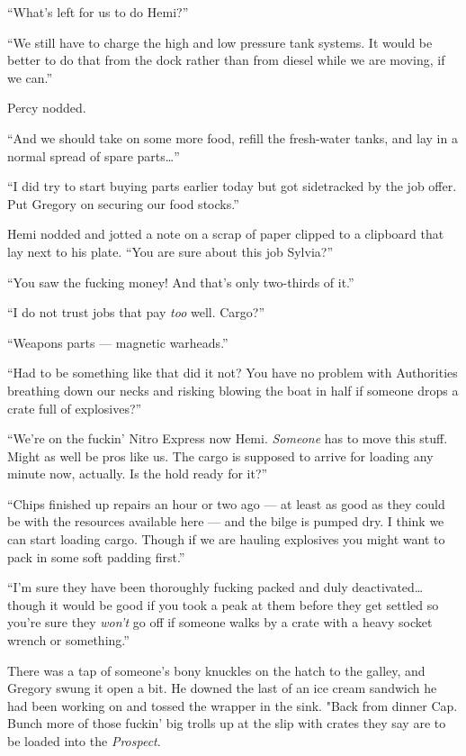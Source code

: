 \documentclass[]{scrbook}
\begin{document}
``What's left for us to do Hemi?''

``We still have to charge the high and low pressure tank systems. It
would be better to do that from the dock rather than from diesel while
we are moving, if we can.''

Percy nodded.

``And we should take on some more food, refill the fresh-water tanks,
and lay in a normal spread of spare parts\ldots{}''

``I did try to start buying parts earlier today but got sidetracked by
the job offer. Put Gregory on securing our food stocks.''

Hemi nodded and jotted a note on a scrap of paper clipped to a clipboard
that lay next to his plate. ``You are sure about this job Sylvia?''

``You saw the fucking money! And that's only two-thirds of it.''

``I do not trust jobs that pay \emph{too} well. Cargo?''

``Weapons parts --- magnetic warheads.''

``Had to be something like that did it not? You have no problem with
Authorities breathing down our necks and risking blowing the boat in
half if someone drops a crate full of explosives?''

``We're on the fuckin' Nitro Express now Hemi. \emph{Someone} has to
move this stuff. Might as well be pros like us. The cargo is supposed to
arrive for loading any minute now, actually. Is the hold ready for it?''

``Chips finished up repairs an hour or two ago --- at least as good as
they could be with the resources available here --- and the bilge is
pumped dry. I think we can start loading cargo. Though if we are hauling
explosives you might want to pack in some soft padding first.''

``I'm sure they have been thoroughly fucking packed and duly
deactivated\ldots{} though it would be good if you took a peak at them
before they get settled so you're sure they \emph{won't} go off if
someone walks by a crate with a heavy socket wrench or something.''

There was a tap of someone's bony knuckles on the hatch to the galley,
and Gregory swung it open a bit. He downed the last of an ice cream
sandwich he had been working on and tossed the wrapper in the sink.
"Back from dinner Cap. Bunch more of those fuckin' big trolls up at the
slip with crates they say are to be loaded into the \emph{Prospect}.
\end{document}
